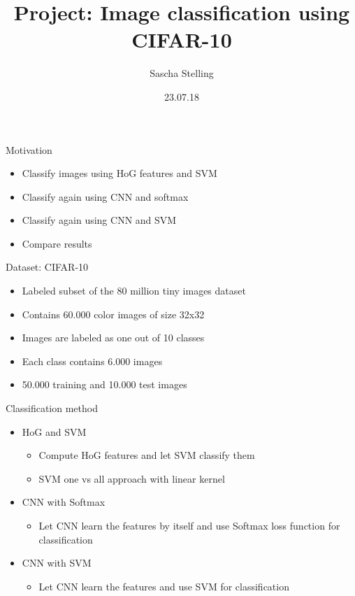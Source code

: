 \documentclass{beamer}
\author{Sascha Stelling}
\title{Project: Image classification using CIFAR-10}
\date{23.07.18}
\begin{document}
\begin{frame}
\titlepage
\end{frame}

\begin{frame}{Motivation}
	\begin{itemize}
		\item Classify images using HoG features and SVM
		\item Classify again using CNN and softmax
		\item Classify again using CNN and SVM
		\item Compare results
	\end{itemize}
\end{frame}

\begin{frame}{Dataset: CIFAR-10}
	\begin{itemize}
		\item Labeled subset of the 80 million tiny images dataset
		\item Contains 60.000 color images of size 32x32
		\item Images are labeled as one out of 10 classes
		\item Each class contains 6.000 images
		\item 50.000 training and 10.000 test images
	\end{itemize}
\end{frame}

\begin{frame}{Classification method}
	\begin{itemize}
		\item HoG and SVM
		\begin{itemize}
			\item Compute HoG features and let SVM classify them
			\item SVM one vs all approach with linear kernel 
		\end{itemize}
		\item CNN with Softmax
		\begin{itemize}
			\item Let CNN learn the features by itself and use Softmax loss function for classification 
		\end{itemize}
		\item CNN with SVM
		\begin{itemize}
			\item Let CNN learn the features and use SVM for classification
		\end{itemize}
	\end{itemize}
\end{frame}
\end{document}
